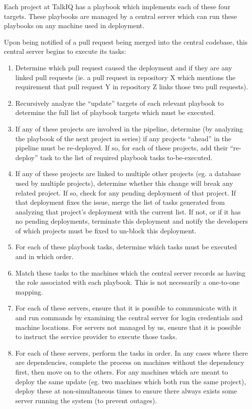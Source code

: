\documentclass[12pt]{article}
\begin{document}
Each project at TalkIQ has a playbook which implements each of these four targets. These playbooks are managed by a central server which can run these playbooks on any machine used in deployment.

Upon being notified of a pull request being merged into the central codebase, this central server begins to execute its tasks:
\begin{enumerate}
\item Determine which pull request caused the deployment and if they are any linked pull requests (ie. a pull request in repository X which mentions the requirement that pull request Y in repository Z links those two pull requests).
\item Recursively analyze the ``update'' targets of each relevant playbook to determine the full list of playbook targets which must be executed.
\item If any of these projects are involved in the pipeline, determine (by analyzing the playbook of the next project in series) if any projects ``ahead'' in the pipeline must be re-deployed. If so, for each of these projects, add their ``re-deploy'' task to the list of required playbook tasks to-be-executed.
\item If any of these projects are linked to multiple other projects (eg. a database used by multiple projects), determine whether this change will break any related project. If so, check for any pending deployment of that project. If that deployment fixes the issue, merge the list of tasks generated from analyzing that project's deployment with the current list. If not, or if it has no pending deployments, terminate this deployment and notify the developers of which projects must be fixed to un-block this deployment.
\item For each of these playbook tasks, determine which tasks must be executed and in which order.
\item Match these tasks to the machines which the central server records as having the role associated with each playbook. This is not necessarily a one-to-one mapping.
\item For each of these servers, ensure that it is possible to communicate with it and run commands by examining the central server for login credentials and machine locations. For servers not managed by us, ensure that it is possible to instruct the service provider to execute those tasks.
\item For each of these servers, perform the tasks in order. In any cases where there are dependencies, complete the process on machines without the dependency first, then move on to the others. For any machines which are meant to deploy the same update (eg. two machines which both run the same project), deploy these at non-simultaneous times to ensure there always exists some server running the system (to prevent outages).

\end{enumerate}
\end{document}
